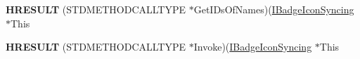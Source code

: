 \begin{DoxyCompactItemize}
\item 
\hypertarget{struct_i_badge_icon_syncing_vtbl_a50aed589320591f3f22db48b8067c06d}{{\bfseries H\-R\-E\-S\-U\-L\-T} (S\-T\-D\-M\-E\-T\-H\-O\-D\-C\-A\-L\-L\-T\-Y\-P\-E $\ast$Get\-I\-Ds\-Of\-Names)(\hyperlink{interface_i_badge_icon_syncing}{I\-Badge\-Icon\-Syncing} $\ast$This}\label{struct_i_badge_icon_syncing_vtbl_a50aed589320591f3f22db48b8067c06d}

\item 
\hypertarget{struct_i_badge_icon_syncing_vtbl_ade6a588506239a0f6e3eee217aaff29b}{{\bfseries H\-R\-E\-S\-U\-L\-T} (S\-T\-D\-M\-E\-T\-H\-O\-D\-C\-A\-L\-L\-T\-Y\-P\-E $\ast$Invoke)(\hyperlink{interface_i_badge_icon_syncing}{I\-Badge\-Icon\-Syncing} $\ast$This}\label{struct_i_badge_icon_syncing_vtbl_ade6a588506239a0f6e3eee217aaff29b}

\end{DoxyCompactItemize}
